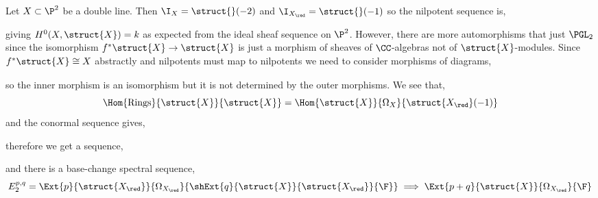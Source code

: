 \documentclass[12pt]{article}
\begin{document}
\begin{rmk}
Let $X \subset \P^2$ be a double line. Then $\I_{X} = \struct{}(-2)$ and $\I_{X_{\red}} = \struct{}(-1)$ so the nilpotent sequence is,
\begin{center}
\end{center}
giving $H^0(X, \struct{X}) = k$ as expected from the ideal sheaf sequence on $\P^2$. However, there are more automorphisms that just $\PGL_2$ since the isomorphism $f^* \struct{X} \to \struct{X}$ is just a morphism of sheaves of $\CC$-algebras not of $\struct{X}$-modules. Since $f^* \struct{X} \cong \strut{X}$ abstractly and nilpotents must map to nilpotents we need to consider morphisms of diagrams,
\begin{center}
\end{center}
so the inner morphism is an isomorphism but it is not determined by the outer morphisms. We see that,
\[ \Hom{\text{Rings}}{\struct{X}}{\struct{X}} = \Hom{\struct{X}}{\Omega_{X}}{\struct{X_{\red}}(-1)} \]
and the conormal sequence gives,
\begin{center}
\end{center}
therefore we get a sequence,
\begin{center}
\end{center}
and there is a base-change spectral sequence,
\[ E_2^{p,q} = \Ext{p}{\struct{X_{\red}}}{\Omega_{X_{\red}}}{\shExt{q}{\struct{X}}{\struct{X_{\red}}}{\F}} \implies \Ext{p+q}{\struct{X}}{\Omega_{X_{\red}}}{\F} \]

\end{rmk}
\end{document}
